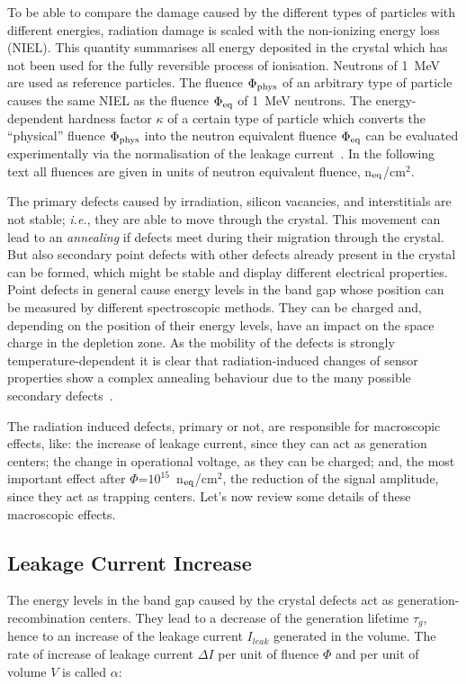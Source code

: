 To be able to compare the damage caused by the different types of particles with different energies, 
radiation damage is scaled with the non-ionizing energy loss (NIEL). This quantity summarises all 
energy deposited in the crystal which has not been used for the fully reversible process of ionisation. 
Neutrons of 1~MeV are used as reference particles. The fluence $\Phi_{\rm phys}$ of an arbitrary type 
of particle causes the same NIEL as the fluence $\Phi_{\rm eq}$ of 1~MeV neutrons.
The energy-dependent hardness factor $\kappa$ of a certain type of particle which converts the 
``physical'' fluence $\Phi_{\rm phys}$ into the neutron equivalent fluence $\Phi_{\rm eq}$ can be 
evaluated experimentally via the normalisation of the leakage 
current~\cite{MOLL2002100,rossi2006pixel}. In the following text all fluences are given in units of neutron equivalent fluence, n$_{\rm eq}$/cm$^2$. 

The primary defects caused by irradiation, silicon vacancies, and interstitials are not stable; {\it i.e.}, 
they 
are able to move through the crystal. This movement can lead to an {\it annealing} if defects 
meet during 
their migration through the crystal. But also secondary point defects with other defects already present 
in the crystal can be formed, which might be stable and display different electrical properties. Point 
defects in general cause energy levels in the band gap whose position can be measured by different 
spectroscopic methods. They can be charged and, depending on the position of their energy levels, 
have an impact on the space charge in the depletion zone. As the mobility of the defects is strongly 
temperature-dependent it is clear that radiation-induced changes of sensor properties show a complex 
annealing behaviour due to the many possible secondary defects~\cite{rossi2006pixel}.

The radiation induced defects, primary or not, are responsible for macroscopic effects, like: the increase 
of leakage current, since they can act as generation centers; the change in operational voltage, as they 
can be charged; and, the most important effect after $\Phi$=$10^{15}$~n$_{\rm eq}$/cm$^2$, the 
reduction of the signal amplitude, since they act as trapping centers. Let's now review some details 
of these macroscopic effects.

\subsection{Leakage Current Increase}
The energy levels in the band gap caused by the crystal defects act as generation-recombination 
centers. 
They lead to a decrease of the generation lifetime $\tau_g$, hence to an increase of the leakage 
current $I_{leak}$ generated in the volume. The rate of increase of leakage current $\Delta I$ per unit of 
fluence $\Phi$ and per unit of volume $V$ is called $\alpha$:

